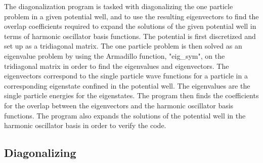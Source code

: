 \documentclass[../main.tex]{subfiles}
\begin{document}
The diagonalization program is tasked with diagonalizing the one particle problem in a given potential well, and to use the resulting eigenvectors to find the overlap coefficients required to expand the solutions of the given potential well in terms of harmonic oscillator basis functions. The potential is first discretized and set up as a tridiagonal matrix. The one particle problem is then solved as an eigenvalue problem by using the Armadillo\cite{Armadillo} function, "eig\_sym", on the tridiagonal matrix in order to find the eigenvalues and eigenvectors. The eigenvectors correspond to the single particle wave functions for a particle in a corresponding eigenstate confined in the potential well. The eigenvalues are the single particle energies for the eigenstates. The program then finds the coefficients for the overlap between the eigenvectors and the harmonic oscillator basis functions. The program also expands the solutions of the potential well in the harmonic oscillator basis in order to verify the code.

\subsection{Diagonalizing}
\end{document}
